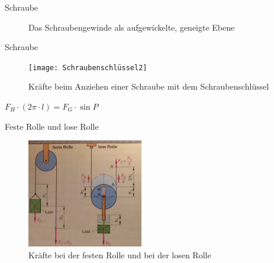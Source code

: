 \documentclass{beamer}
\begin{document}
{\begin{exampleblock}{Schraube}
\begin{figure}
	  \vspace{-3mm}
	  \caption{Das Schraubengewinde als aufgewickelte, geneigte Ebene}
   \end{figure}
\end{exampleblock} \newpage
\begin{exampleblock}{Schraube}
    \begin{figure}
	  \texttt{[image: Schraubenschlüssel2]}
	  \vspace{-3mm}
	  \caption{Kräfte beim Anziehen einer Schraube mit dem Schraubenschlüssel}
   \end{figure}
   $F_H\cdot (2\pi\cdot l)=F_G\cdot \sin P$
\end{exampleblock} \newpage
\begin{exampleblock}{Feste Rolle und lose Rolle}
    \begin{figure}
	  \includegraphics[width=0.45\textwidth]{Rolle}
	  \vspace{-3mm}
	  \caption{Kräfte bei der festen Rolle und bei der losen Rolle}
   \end{figure}
\end{exampleblock}
}
\frame[allowframebreaks]
\end{document}
